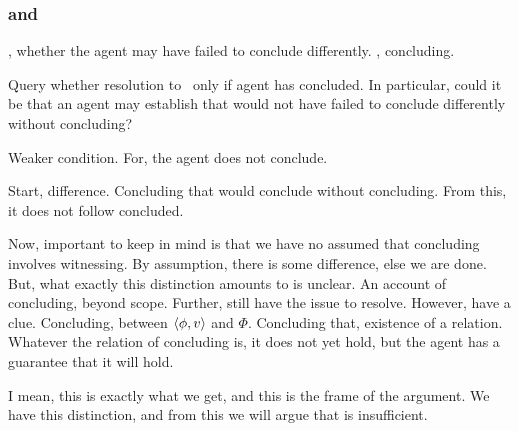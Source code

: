 \subsubsection{\iCS{} and \iCSm{}}
\label{overview:sec:iCS-iCSm-limitation-closure}

\begin{note}
  \qzs{}, whether the agent may have failed to conclude differently.
  \iCS{}, concluding.

  Query whether resolution to~\qzs{} only if agent has concluded.
  In particular, could it be that an agent may establish that would not have failed to conclude differently without concluding?

  Weaker condition.
  For, the agent does not conclude.
\end{note}

\begin{note}
  Start, difference.
  Concluding that would conclude without concluding.
  From this, it does not follow concluded.

  Now, important to keep in mind is that we have no assumed that concluding involves witnessing.
  By assumption, there is some difference, else we are done.
  But, what exactly this distinction amounts to is unclear.
  An account of concluding, beyond scope.
  Further, still have the issue to resolve.
  However, have a clue.
  Concluding, between \(\langle \phi, v \rangle\) and \(\Phi\).
  Concluding that, existence of a relation.
  Whatever the relation of concluding is, it does not yet hold, but the agent has a guarantee that it will hold.

  I mean, this is exactly what we get, and this is the frame of the argument.
  We have this distinction, and from this we will argue that \iCSm{} is insufficient.
\end{note}

